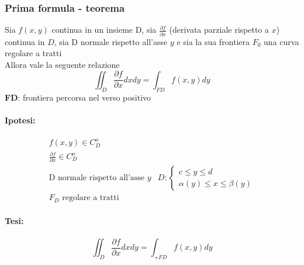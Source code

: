 \subsubsection{Prima formula - teorema}
\begin{defi}
	Sia $f(x,y)$ continua in un insieme D, sia $\frac{\partial f}{\partial x}$
	(derivata parziale rispetto a $x$) continua in $D$, sia D normale rispetto all'asse
	$y$ e sia la sua frontiera $F_0$ una curva regolare a tratti\\
	Allora vale la seguente relazione 
	\begin{equation*}
		\iint_{D}\frac{\partial f}{\partial x} dxdy=\int_{FD} f(x,y)dy
	\end{equation*}
	\textbf{FD}: frontiera percorsa nel verso positivo 
	\begin{multicols}{2}
		\paragraph{Ipotesi:}
		\begin{equation*}
			\begin{matrix}
				f(x,y)\in C^o_D\\
				\frac{\partial f}{\partial x}\in C_D^o\\
					\text{D normale rispetto all'asse }y & D: \begin{cases}
						c\leq y\leq d\\
						\alpha (y) \leq x \leq \beta (y)
					\end{cases}\\
					F_D \text{ regolare a tratti}
			\end{matrix}
		\end{equation*}
		\paragraph{Tesi:}
		\begin{equation*}
			\displaystyle\iint_D \frac{\partial f}{\partial x} dxdy=\int_{+FD}
			f(x,y)dy
		\end{equation*}
	\end{multicols}
\end{defi}
